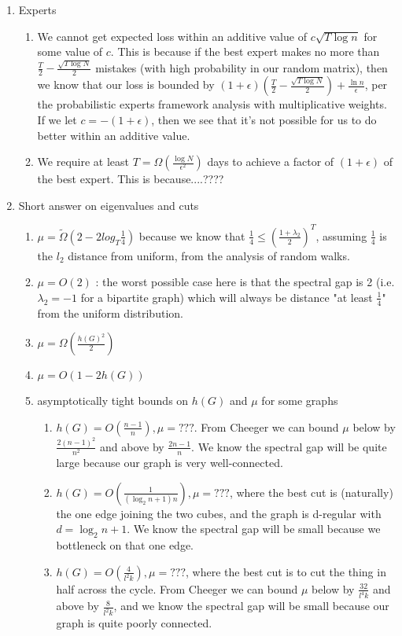 \documentclass[a4paper]{article}
\begin{document}
\begin{enumerate}
\begin{enumerate}
	\end{enumerate}
\item Experts
	\begin{enumerate}
		\item We cannot get expected loss within an additive value of $c\sqrt{T\log n}$ for some value of $c$.  This is because if the best expert makes no more than $\frac{T}{2} - \frac{\sqrt{T\log N}}{2}$ mistakes (with high probability in our random matrix), then we know that our loss is bounded by $(1+\epsilon)(\frac{T}{2} - \frac{\sqrt{T\log N}}{2}) + \frac{\ln n}{\epsilon}$, per the probabilistic experts framework analysis with multiplicative weights.  If we let $c=-(1+\epsilon)$, then we see that it's not possible for us to do better within an additive value.
		\item We require at least $T = \Omega(\frac{\log N}{\epsilon ^2})$ days to achieve a factor of $(1+ \epsilon)$ of the best expert.   This is because....????  
	\end{enumerate}
\item Short answer on eigenvalues and cuts
	\begin{enumerate}
		\item $\mu = \tilde{\Omega}(2-2log_T \frac{1}{4})$ because we know that $\frac{1}{4} \leq (\frac{1+\lambda_2}{2})^T$, assuming $\frac{1}{4}$ is the $l_2$ distance from uniform, from the analysis of random walks.
		\item $\mu = O(2)$ : the worst possible case here is that the spectral gap is 2 (i.e. $\lambda_2=-1$ for a bipartite graph) which will always be distance "at least $\frac{1}{4}$" from the uniform distribution.
		\item $\mu = \Omega(\frac{h(G)^2}{2})$
		\item $\mu = O(1-2h(G))$
		\item asymptotically tight bounds on $h(G)$ and $\mu$ for some graphs
			\begin{enumerate}
				\item $h(G) = O(\frac{n-1}{n}), \mu = ???$.  From Cheeger we can bound $\mu$ below by $\frac{2(n-1)^2}{n^2}$ and above by $\frac{2n-1}{n}$.  We know the spectral gap will be quite large because our graph is very well-connected.
				\item $h(G) = O(\frac{1}{(\log_2{n} +1)n}), \mu = ???$, where the best cut is (naturally) the one edge joining the two cubes, and the graph is d-regular with $d = \log_2{n} +1$.  We know the spectral gap will be small because we bottleneck on that one edge.
				\item $h(G) = O(\frac{4}{l^2k}), \mu = ???$, where the best cut is to cut the thing in half across the cycle.  From Cheeger we can bound $\mu$ below by $\frac{32}{l^4k}$ and above by $\frac{8}{l^2k}$, and we know the spectral gap will be small because our graph is quite poorly connected.

\end{enumerate}
\end{enumerate}
\end{enumerate}
\end{document}
